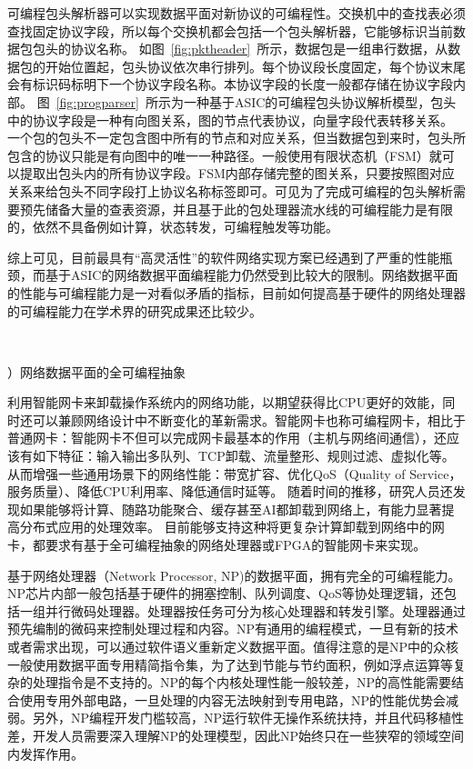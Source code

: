 可编程包头解析器可以实现数据平面对新协议的可编程性。交换机中的查找表必须查找固定协议字段，所以每个交换机都会包括一个包头解析器，它能够标识当前数据包包头的协议名称。
如图~\ref{fig:pktheader}~所示，数据包是一组串行数据，从数据包的开始位置起，包头协议依次串行排列。每个协议段长度固定，每个协议末尾会有标识码标明下一个协议字段名称。本协议字段的长度一般都存储在协议字段内部。
图~\ref{fig:progparser}~所示为一种基于ASIC的可编程包头协议解析模型，包头中的协议字段是一种有向图关系，图的节点代表协议，向量字段代表转移关系。
一个包的包头不一定包含图中所有的节点和对应关系，但当数据包到来时，包头所包含的协议只能是有向图中的唯一一种路径。一般使用有限状态机（FSM）就可以提取出包头内的所有协议字段。FSM内部存储完整的图关系，只要按照图对应关系来给包头不同字段打上协议名称标签即可。可见为了完成可编程的包头解析需要预先储备大量的查表资源，并且基于此的包处理器流水线的可编程能力是有限的，依然不具备例如计算，状态转发，可编程触发等功能。

综上可见，目前最具有“高灵活性”的软件网络实现方案已经遇到了严重的性能瓶颈，而基于ASIC的网络数据平面编程能力仍然受到比较大的限制。网络数据平面的性能与可编程能力是一对看似矛盾的指标，目前如何提高基于硬件的网络处理器的可编程能力在学术界的研究成果还比较少。
 
  
   \ \ 

\label{chap123}


{）网络数据平面的全可编程抽象}


利用智能网卡来卸载操作系统内的网络功能，以期望获得比CPU更好的效能，同时还可以兼顾网络设计中不断变化的革新需求。智能网卡也称可编程网卡，相比于普通网卡：智能网卡不但可以完成网卡最基本的作用（主机与网络间通信），还应该有如下特征：输入输出多队列、TCP卸载、流量整形、规则过滤、虚拟化等。从而增强一些通用场景下的网络性能：带宽扩容、优化QoS（Quality of Service，服务质量）、降低CPU利用率、降低通信时延等。
随着时间的推移，研究人员还发现如果能够将计算、随路功能聚合、缓存甚至AI都卸载到网络上，有能力显著提高分布式应用的处理效率。
目前能够支持这种将更复杂计算卸载到网络中的网卡，都要求有基于全可编程抽象的网络处理器或FPGA的智能网卡来实现。

基于网络处理器（Network Processor, NP)的数据平面，拥有完全的可编程能力。NP芯片内部一般包括基于硬件的拥塞控制、队列调度、QoS等协处理逻辑，还包括一组并行微码处理器。处理器按任务可分为核心处理器和转发引擎。处理器通过预先编制的微码来控制处理过程和内容。NP有通用的编程模式，一旦有新的技术或者需求出现，可以通过软件语义重新定义数据平面。值得注意的是NP中的众核一般使用数据平面专用精简指令集，为了达到节能与节约面积，例如浮点运算等复杂的处理指令是不支持的。NP的每个内核处理性能一般较差，NP的高性能需要结合使用专用外部电路，一旦处理的内容无法映射到专用电路，NP的性能优势会减弱。另外，NP编程开发门槛较高，NP运行软件无操作系统扶持，并且代码移植性差，开发人员需要深入理解NP的处理模型，因此NP始终只在一些狭窄的领域空间内发挥作用。



